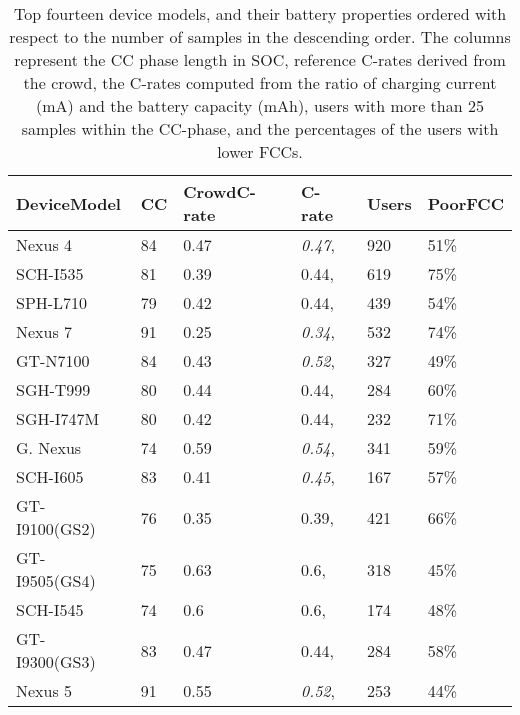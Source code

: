 \documentclass[journal]{IEEEtran}
\begin{document}
\begin{table}[t]
\begin{center}
            \caption{Top fourteen device models, and their battery properties ordered with respect to the number of samples in the descending order. The columns represent the CC phase length in SOC, reference C-rates derived from the crowd, the C-rates computed from the ratio of charging current (mA) and the battery capacity (mAh), users with more than 25 samples within the CC-phase,  and the percentages of the users with lower FCCs.}

  \footnotesize
    \begin{tabular}{|p{18mm}|p{4mm}|p{8mm}|p{10mm}|p{6mm}|p{5mm}|}
      \hline
       \textbf{Device\break Model}  & \textbf{CC} & \textbf{Crowd\break C-rate} & \textbf{C-rate\break}& \textbf{Users}& \textbf{Poor\break FCC}\\\hline
       Nexus 4 &84& 0.47& \textit{0.47},&920&51\%\\\hline 
       SCH-I535&81 &0.39&0.44,&619&75\%\\\hline
SPH-L710 &79&0.42&0.44,&439&54\%\\\hline
       Nexus 7& 91&0.25&\textit{0.34},&532&74\%\\\hline
       GT-N7100&84&0.43& \textit{0.52},&327&49\%\\\hline
       SGH-T999 & 80&0.44&0.44,&284&60\%\\\hline
       SGH-I747M & 80&0.42&0.44,&232&71\%\\\hline
       G. Nexus & 74&0.59&\textit{0.54},&341&59\%\\\hline
       SCH-I605 & 83&0.41&\textit{0.45},&167&57\%\\\hline     
       GT-I9100(GS2)&  76&0.35&0.39,&421&66\%\\\hline
       GT-I9505(GS4)& 75&0.63&0.6,&318&45\%\\\hline
       SCH-I545&  74&0.6&0.6,&174&48\%\\\hline
       GT-I9300(GS3)& 83&0.47&0.44,&284&58\%\\\hline
       Nexus 5	& 91&0.55& \textit{0.52},&253&44\%\\\hline
    \end{tabular}


     \label{tab:carat_results}
    \end{center}
\end{table}
\end{document}

